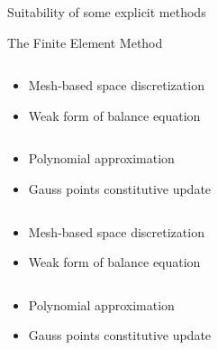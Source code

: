 \begin{frame}{Suitability of some explicit methods}
  \begin{block}{The Finite Element Method \cite{Belytschko}}
    \vskip 4pt
    \begin{overprint}
      \begin{columns}
        \begin{footnotesize}
          \begin{column}{0.5\textwidth}
            \begin{itemize}
            \item[] Mesh-based space discretization
            \item[] Weak form of balance equation
            \end{itemize}
          \end{column}
          \begin{column}{0.5\textwidth} 
            \begin{itemize}
            \item[] Polynomial approximation
            \item[] Gauss points constitutive update
            \end{itemize}
          \end{column}
        \end{footnotesize}
      \end{columns}
      \begin{columns}
        \begin{footnotesize}
          \begin{column}{0.5\textwidth}
            \begin{itemize}
            \item[] Mesh-based space discretization
            \item[] Weak form of balance equation
            \end{itemize}
          \end{column}
          \begin{column}{0.5\textwidth} 
            \begin{itemize}
            \item[] Polynomial approximation
            \item[] Gauss points constitutive update
            \end{itemize}
          \end{column}
        \end{footnotesize}
      \end{columns}

\end{overprint}
\end{block}
\end{frame}
